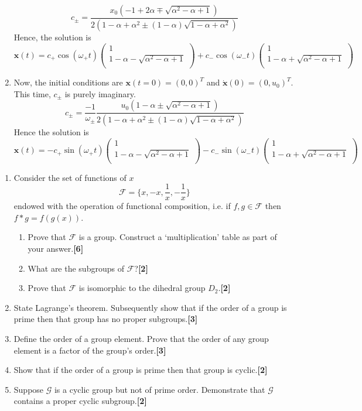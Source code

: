 \documentclass[a4paper]{article}
\begin{document}
\begin{ans}
\begin{enumerate}[label=(\roman*)]
$$c_\pm=\frac{x_0(-1+2\alpha\mp\sqrt{\alpha^2-\alpha+1})}{2(1-\alpha+\alpha^2\pm(1-\alpha)\sqrt{1-\alpha+\alpha^2})}$$
Hence, the solution is 
$$\mathbf{x}(t)=c_+\cos(\omega_+t)\begin{pmatrix}1\\1-\alpha-\sqrt{\alpha^2-\alpha+1}\\\end{pmatrix}+c_-\cos(\omega_-t)\begin{pmatrix}1\\1-\alpha+\sqrt{\alpha^2-\alpha+1}\\\end{pmatrix}$$
\item Now, the initial conditions are $\mathbf{x}(t=0)=(0,0)^T$ and $\mathbf{\dot{x}}(0)=(0,u_0)^T$. This time, $c_\pm$ is purely imaginary.
$$c_\pm=\frac{-1}{\omega_\pm}\frac{u_0(1-\alpha\pm\sqrt{\alpha^2-\alpha+1})}{2(1-\alpha+\alpha^2\pm(1-\alpha)\sqrt{1-\alpha+\alpha^2})}$$
Hence the solution is $$\mathbf{x}(t)=-c_+\sin(\omega_+t)\begin{pmatrix}1\\1-\alpha-\sqrt{\alpha^2-\alpha+1}\\\end{pmatrix}-c_-\sin(\omega_-t)\begin{pmatrix}1\\1-\alpha+\sqrt{\alpha^2-\alpha+1}\\\end{pmatrix}$$
\end{enumerate}
\end{ans}
\begin{qns}\leavevmode
\begin{enumerate}[label=(\roman*)]
\item Consider the set of functions of $x$
$$\mathcal{F}=\bigg\{x,-x,\frac{1}{x},-\frac{1}{x}\bigg\}$$
endowed with the operation of functional composition, i.e. if $f,g\in\mathcal{F}$ then $f *g = f(g(x))$.
\begin{enumerate}[label=(\alph*)]
\item Prove that $\mathcal{F}$ is a group. Construct a ‘multiplication’ table as part of your answer.\hfill\textbf{[6]}
\item What are the subgroups of $\mathcal{F}$?\hfill\textbf{[2]}
\item Prove that $\mathcal{F}$ is isomorphic to the dihedral group $D_2$.\hfill\textbf{[2]}
\end{enumerate}
\item State Lagrange’s theorem. Subsequently show that if the order of a group is prime then that group has no proper subgroups.\hfill\textbf{[3]}
\item Define the order of a group element. Prove that the order of any group element is a factor of the group’s order.\hfill\textbf{[3]}
\item Show that if the order of a group is prime then that group is cyclic.\hfill\textbf{[2]}
\item Suppose $\mathcal{G}$ is a cyclic group but not of prime order. Demonstrate that $\mathcal{G}$ contains a
proper cyclic subgroup.\hfill\textbf{[2]}
\end{enumerate}
\end{qns}
\end{document}
